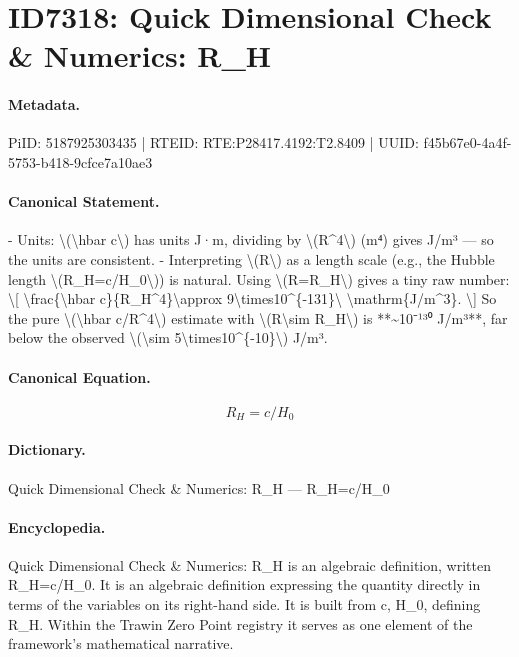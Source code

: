 \section*{ID7318: Quick Dimensional Check \& Numerics: R\_H}
\paragraph{Metadata.}
PiID: 5187925303435 | RTEID: RTE:P28417.4192:T2.8409 | UUID: f45b67e0-4a4f-5753-b418-9cfce7a10ae3

\paragraph{Canonical Statement.}
- Units: \textbackslash{}(\textbackslash{}hbar c\textbackslash{}) has units J·m, dividing by \textbackslash{}(R\textasciicircum{}4\textbackslash{}) (m⁴) gives J/m³ — so the units are consistent. - Interpreting \textbackslash{}(R\textbackslash{}) as a length scale (e.g., the Hubble length \textbackslash{}(R\_H=c/H\_0\textbackslash{})) is natural. Using \textbackslash{}(R=R\_H\textbackslash{}) gives a tiny raw number: \textbackslash{}[ \textbackslash{}frac\{\textbackslash{}hbar c\}\{R\_H\textasciicircum{}4\}\textbackslash{}approx 9\textbackslash{}times10\textasciicircum{}\{-131\}\textbackslash{} \textbackslash{}mathrm\{J/m\textasciicircum{}3\}. \textbackslash{}] So the pure \textbackslash{}(\textbackslash{}hbar c/R\textasciicircum{}4\textbackslash{}) estimate with \textbackslash{}(R\textbackslash{}sim R\_H\textbackslash{}) is **\textasciitilde{}10⁻¹³⁰ J/m³**, far below the observed \textbackslash{}(\textbackslash{}sim 5\textbackslash{}times10\textasciicircum{}\{-10\}\textbackslash{}) J/m³.

\paragraph{Canonical Equation.}
\[
R_H=c/H_0
\]

\paragraph{Dictionary.}
Quick Dimensional Check \& Numerics: R\_H — R\_H=c/H\_0

\paragraph{Encyclopedia.}
Quick Dimensional Check \& Numerics: R\_H is an algebraic definition, written R\_H=c/H\_0. It is an algebraic definition expressing the quantity directly in terms of the variables on its right-hand side. It is built from c, H\_0, defining R\_H. Within the Trawin Zero Point registry it serves as one element of the framework's mathematical narrative.

